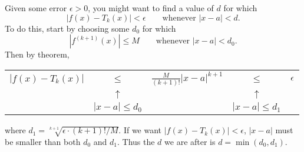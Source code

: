 Given some error $\epsilon>0$, you might want to find a value of $d$ for which 
$$|f(x)-T_k(x)|<\epsilon\quad\quad\text{whenever } |x-a|<d.$$
To do this, start by choosing some $d_0$ for which 
$$\left|f^{(k+1)}(x)\right| \leq M\quad\quad\text{whenever } |x-a|<d_0.$$
Then by theorem,
\begin{center}
\begin{tabular}{ccccc}
$|f(x)-T_k(x)|$ & $\leq$               & $\displaystyle\frac{M}{(k+1)!}|x-a|^{k+1}$  & $\leq$         & $\epsilon$ \\
                       & $\uparrow$       &                         					    & $\uparrow$ & \\
                       & $|x-a|\leq d_0$ &     							            & $|x-a|\leq d_1$ \\
\end{tabular}
\end{center}
where $d_1=\sqrt[k+1]{\epsilon\cdot (k+1)!/M}$.  If we want $|f(x)-T_k(x)|<\epsilon$, $|x-a|$ must be smaller than both $d_0$ and $d_1$. Thus the $d$ we are after is $d=\min\left(d_0, d_1\right)$.

















